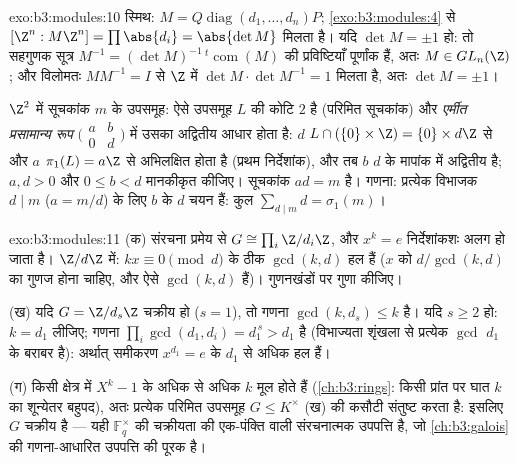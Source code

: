 \begin{solution}{exo:b3:modules:10}
स्मिथ: $M = Q\operatorname{diag}(d_1,\dots,d_n)P$; \cref{exo:b3:modules:4} से $[\Z^n : M\Z^n] = \prod\abs{d_i} =
\abs{\det M}$ मिलता है। यदि $\det M = \pm 1$ हो: तो सहगुणक सूत्र
$M^{-1} = (\det M)^{-1}\,{}^{t}\!\operatorname{com}(M)$ की प्रविष्टियाँ पूर्णांक हैं, अतः $M \in GL_n(\Z)$; और विलोमतः $MM^{-1} = I$ से
$\Z$ में $\det M \cdot \det M^{-1} = 1$ मिलता है, अतः $\det M = \pm1$।

$\Z^2$ में सूचकांक $m$ के उपसमूह: ऐसे उपसमूह $L$ की कोटि $2$
है (परिमित सूचकांक) और \emph{एर्मीत प्रसामान्य रूप} $\bigl(\begin{smallmatrix} a & b\\ 0 &
d\end{smallmatrix}\bigr)$ में उसका
अद्वितीय आधार होता है: $d$ $L \cap (\{0\}
\times \Z) = \{0\} \times d\Z$ से और $a$ $\pi_1(L) = a\Z$ से अभिलक्षित
होता है (प्रथम निर्देशांक), और तब $b$ $d$ के मापांक में अद्वितीय
है; $a, d
> 0$ और $0 \leq b < d$ मानकीकृत कीजिए। सूचकांक $ad = m$ है। गणना: प्रत्येक
विभाजक $d \mid m$ ($a = m/d$) के लिए $b$ के $d$ चयन हैं: कुल $\sum_{d \mid m} d = \sigma_1(m)$।
\end{solution}

\begin{solution}{exo:b3:modules:11}
(क) संरचना प्रमेय से $G \cong \prod_i\Z/d_i\Z$, और $x^k = e$ निर्देशांकशः अलग हो जाता है।
$\Z/d\Z$ में: $kx \equiv 0
\pmod d$ के ठीक $\gcd(k, d)$ हल हैं ($x$ को $d/\gcd(k,d)$ का गुणज होना
चाहिए, और ऐसे $\gcd(k, d)$ हैं)। गुणनखंडों पर गुणा कीजिए।

(ख) यदि $G = \Z/d_s\Z$ चक्रीय हो ($s = 1$), तो गणना $\gcd(k, d_s) \leq k$ है। यदि $s \geq 2$ हो:
$k = d_1$ लीजिए; गणना $\prod_i\gcd(d_1, d_i) = d_1^{\,s} > d_1$ है (विभाज्यता शृंखला से प्रत्येक $\gcd$ $d_1$
के बराबर है): अर्थात् समीकरण $x^{d_1} = e$ के $d_1$ से अधिक हल हैं।

(ग) किसी क्षेत्र में $X^k - 1$ के अधिक से अधिक $k$ मूल होते हैं (\cref{ch:b3:rings}:
किसी प्रांत पर घात $k$ का शून्येतर बहुपद), अतः प्रत्येक परिमित
उपसमूह $G \leq K^\times$ (ख) की कसौटी संतुष्ट करता है: इसलिए $G$ चक्रीय है
--- यही $\mathbb F_q^\times$ की चक्रीयता की एक-पंक्ति वाली संरचनात्मक उपपत्ति है,
जो \cref{ch:b3:galois} की गणना-आधारित उपपत्ति की पूरक है।
\end{solution}

